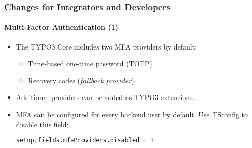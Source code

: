 %

\begin{frame}[fragile]
	\frametitle{Changes for Integrators and Developers}
	\framesubtitle{Multi-Factor Authentication (1)}


	\begin{itemize}
		\item The TYPO3 Core includes two MFA providers by default:

			\begin{itemize}
				\item Time-based one-time password (TOTP)
				\item Recovery codes (\textit{fallback provider})
			\end{itemize}

		\item Additional providers can be added as TYPO3 extensions.
		\item MFA can be configured for every backend user by default.
			Use TSconfig to disable this field:
\begin{lstlisting}
setup.fields.mfaProviders.disabled = 1
\end{lstlisting}

	\end{itemize}

\end{frame}

